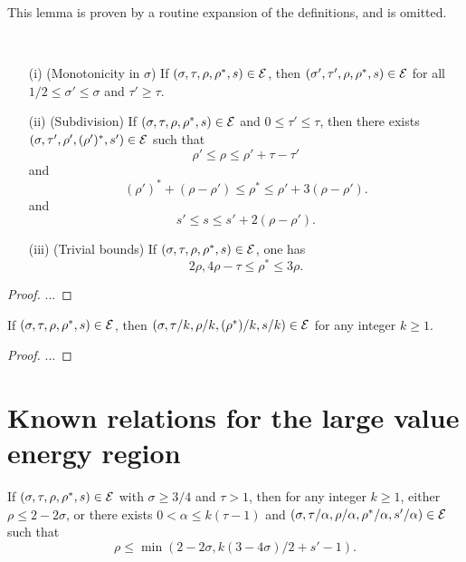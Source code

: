 This lemma is proven by a routine expansion of the definitions, and is omitted.

\begin{lemma}\label{lve-basic}\
    \begin{itemize}
        \item[(i)] (Monotonicity in $\sigma$) If $(\sigma,\tau,\rho,\rho^*,s) \in \mathcal{E}$, then
        $(\sigma',\tau',\rho,\rho^*,s) \in \mathcal{E}$ for all $1/2 \leq \sigma' \leq \sigma$ and $\tau' \geq \tau$.
        \item[(ii)] (Subdivision) If $(\sigma,\tau,\rho,\rho^*,s) \in \mathcal{E}$ and $0 \leq \tau' \leq \tau$, then there exists $(\sigma,\tau', \rho', (\rho')^*,s') \in \mathcal{E}$ such that
        $$\rho' \leq \rho \leq \rho' + \tau - \tau'$$
        and
        $$(\rho')^* + (\rho-\rho') \leq \rho^* \leq \rho' + 3(\rho-\rho').$$
        and
        $$s' \leq s \leq s' + 2(\rho-\rho').$$
        \item[(iii)]  (Trivial bounds) If $(\sigma,\tau,\rho,\rho^*,s) \in \mathcal{E}$, one has
        $$ 2\rho, 4\rho-\tau \leq \rho^* \leq 3 \rho.$$
    \end{itemize}
\end{lemma}

\begin{proof}  ...
\end{proof}


\begin{lemma}\label{power-energy}  If $(\sigma,\tau,\rho,\rho^*,s) \in \mathcal{E}$, then $(\sigma,\tau/k, \rho/k, (\rho^*)/k,s/k) \in \mathcal{E}$ for any integer $k \geq 1$.
\end{lemma}

\begin{proof}
    ...
\end{proof}

\section{Known relations for the large value energy region}

\begin{theorem}\cite[\S 11.5]{ivic} If $(\sigma,\tau,\rho,\rho^*,s) \in \mathcal{E}$ with $\sigma \geq 3/4$ and $\tau>1$, then for any integer $k \geq 1$, either $\rho \leq 2-2\sigma$, or there exists $0 < \alpha \leq k(\tau-1)$ and $(\sigma, \tau/\alpha, \rho/\alpha, \rho^*/\alpha, s'/\alpha) \in \mathcal{E}$ such that
$$ \rho \leq \min( 2-2\sigma, k(3-4\sigma)/2 + s' - 1).$$
\end{theorem}

